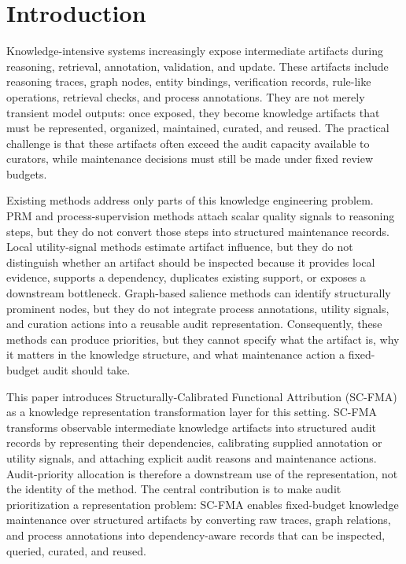 \documentclass[a4paper,fleqn]{cas-sc}
\begin{document}
\maketitle

\section{Introduction}

Knowledge-intensive systems increasingly expose intermediate artifacts during reasoning, retrieval, annotation, validation, and update. These artifacts include reasoning traces, graph nodes, entity bindings, verification records, rule-like operations, retrieval checks, and process annotations. They are not merely transient model outputs: once exposed, they become knowledge artifacts that must be represented, organized, maintained, curated, and reused. The practical challenge is that these artifacts often exceed the audit capacity available to curators, while maintenance decisions must still be made under fixed review budgets.

Existing methods address only parts of this knowledge engineering problem. PRM and process-supervision methods attach scalar quality signals to reasoning steps, but they do not convert those steps into structured maintenance records. Local utility-signal methods estimate artifact influence, but they do not distinguish whether an artifact should be inspected because it provides local evidence, supports a dependency, duplicates existing support, or exposes a downstream bottleneck. Graph-based salience methods can identify structurally prominent nodes, but they do not integrate process annotations, utility signals, and curation actions into a reusable audit representation. Consequently, these methods can produce priorities, but they cannot specify what the artifact is, why it matters in the knowledge structure, and what maintenance action a fixed-budget audit should take.

This paper introduces Structurally-Calibrated Functional Attribution (SC-FMA) as a knowledge representation transformation layer for this setting. SC-FMA transforms observable intermediate knowledge artifacts into structured audit records by representing their dependencies, calibrating supplied annotation or utility signals, and attaching explicit audit reasons and maintenance actions. Audit-priority allocation is therefore a downstream use of the representation, not the identity of the method. The central contribution is to make audit prioritization a representation problem: SC-FMA enables fixed-budget knowledge maintenance over structured artifacts by converting raw traces, graph relations, and process annotations into dependency-aware records that can be inspected, queried, curated, and reused.
\end{document}
